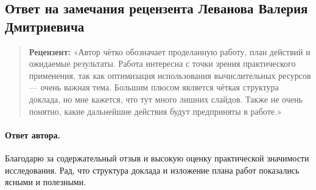 \documentclass[11pt]{article}
\begin{document}
\pagestyle{empty}

\begin{center}
    \subsection*{Ответ на замечания рецензента Леванова Валерия Дмитриевича}
\end{center}

\begin{quote}
    \textbf{Рецензент:}
    «Автор чётко обозначает проделанную работу, план действий и ожидаемые результаты. Работа интересна с точки зрения практического применения, так как оптимизация использования вычислительных ресурсов — очень важная тема. Большим плюсом является чёткая структура доклада, но мне кажется, что тут много лишних слайдов. Также не очень понятно, какие дальнейшие действия будут предприняты в работе.»
\end{quote}

\paragraph{Ответ автора.}
Благодарю за содержательный отзыв и высокую оценку практической значимости исследования. Рад, что структура доклада и изложение плана работ показались ясными и полезными.
\end{document}
